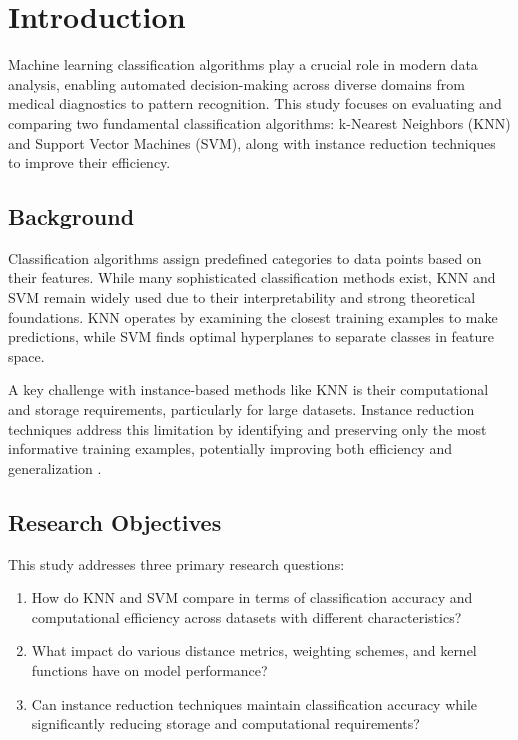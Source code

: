 \section{Introduction}
\label{sec:introduction}

Machine learning classification algorithms play a crucial role in modern data analysis, enabling automated decision-making across diverse domains from medical diagnostics to pattern recognition. This study focuses on evaluating and comparing two fundamental classification algorithms: k-Nearest Neighbors (KNN) and Support Vector Machines (SVM), along with instance reduction techniques to improve their efficiency.

\subsection{Background}

Classification algorithms assign predefined categories to data points based on their features. While many sophisticated classification methods exist, KNN and SVM remain widely used due to their interpretability and strong theoretical foundations. KNN operates by examining the closest training examples to make predictions, while SVM finds optimal hyperplanes to separate classes in feature space.

A key challenge with instance-based methods like KNN is their computational and storage requirements, 
particularly for large datasets. Instance reduction techniques address this limitation by identifying 
and preserving only the most informative training examples, potentially improving both efficiency 
and generalization \cite{knn}.

\subsection{Research Objectives}

This study addresses three primary research questions:

\begin{enumerate}
    \item How do KNN and SVM compare in terms of classification accuracy and computational efficiency across datasets with different characteristics?
    \item What impact do various distance metrics, weighting schemes, and kernel functions have on model performance?
    \item Can instance reduction techniques maintain classification accuracy while significantly reducing storage and computational requirements?
\end{enumerate}

